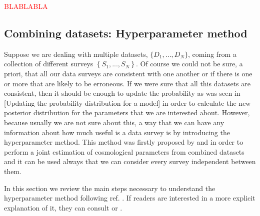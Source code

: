 \documentclass[onecolumn,           %
               showpacs,            %
               preprintnumbers,     %
               aps,                 %
               prl,          	    %
               letterpaper,             %
               superscriptaddress,      %
               nofootinbib,         %
               tightenlines,        %
               floats,floatfix      %
               ,usenatbib,
               ]{revtex4-1}
\begin{document}
\textcolor{red}{BLABLABLA}

\subsection{Combining datasets: Hyperparameter method}

Suppose we are dealing with multiple datasets,  $\lbrace D_1,...,D_N\rbrace$, coming from a collection of different surveys $\left\lbrace S_1,...,S_N\right\rbrace$. Of course we could not be sure, a priori, that all our data surveys are consistent with one another or if there is one or more that are likely to be erroneous. If we were sure that all this datasets are consistent, then it should be enough to update the probability as was seen in [Updating the probability distribution for a model] in order to calculate the new posterior distribution for the parameters that we are interested about. However, because usually we are not sure about this, a way that we can have any information about how much useful is a data survey is by introducing the hyperparameter method. This method was firstly proposed by \cite{hiperp} and \cite{hiperp1} in order to perform a joint estimation of cosmological parameters from combined datasets and it can be used always that we can consider every survey independent between them.

In this section we review the main steps necessary to understand the hyperparameter method following ref. \cite{hiperp1}. If readers are interested in a more explicit explanation of it, they can consult \cite{hiperp} or \cite{hiperp1}.
\end{document}
